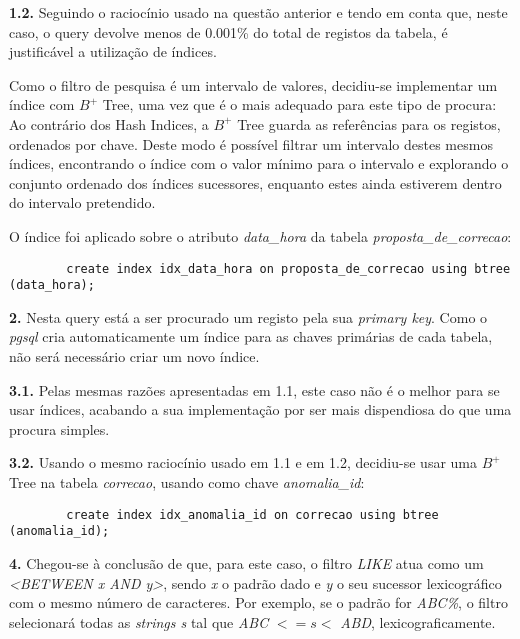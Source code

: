 \documentclass[12pt]{report}
\begin{document}
    \par \textbf{1.2.} Seguindo o raciocínio usado na questão anterior e tendo em conta que, neste caso, o query devolve menos de 0.001\% do total de registos da tabela, é justificável a utilização de índices.

    \par Como o filtro de pesquisa é um intervalo de valores, decidiu-se implementar um índice com $B^+$ Tree, uma vez que é o mais adequado para este tipo de procura: Ao contrário dos Hash Indices, a $B^+$ Tree guarda as referências para os registos, ordenados por chave. Deste modo é possível filtrar um intervalo destes mesmos índices, encontrando o índice com o valor mínimo para o intervalo e explorando o conjunto ordenado dos índices sucessores, enquanto estes ainda estiverem dentro do intervalo pretendido.
    \par O índice foi aplicado sobre o atributo \textit{{data\_hora}} da tabela \textit{proposta\_de\_correcao}:\\
    \footnotesize \begin{verbatim}
        create index idx_data_hora on proposta_de_correcao using btree (data_hora);
    \end{verbatim}\normalsize

    \par \textbf{2.} Nesta query está a ser procurado um registo pela sua \textit{primary key}. Como o \textit{pgsql} cria automaticamente um índice para as chaves primárias de cada tabela, não será necessário criar um novo índice.\\

    \par \textbf{3.1.} Pelas mesmas razões apresentadas em 1.1, este caso não é o melhor para se usar índices, acabando a sua implementação por ser mais dispendiosa do que uma procura simples.\\

    \par \textbf{3.2.} Usando o mesmo raciocínio usado em 1.1 e em 1.2, decidiu-se usar uma $B^+$ Tree na tabela \textit{correcao}, usando como chave \textit{anomalia\_id}:\\
    \footnotesize \begin{verbatim}
        create index idx_anomalia_id on correcao using btree (anomalia_id);
    \end{verbatim}\normalsize


    \par \textbf{4.} Chegou-se à conclusão de que, para este caso, o filtro \textit{LIKE} atua como um \textit{<BETWEEN x AND y>}, sendo \textit{x} o padrão dado e \textit{y} o seu sucessor lexicográfico com o mesmo número de caracteres. Por exemplo, se o padrão for \textit{ABC\%}, o filtro selecionará todas as \textit{strings s} tal que \textit{ABC} $<= s <$ \textit{ABD}, lexicograficamente.
\end{document}
